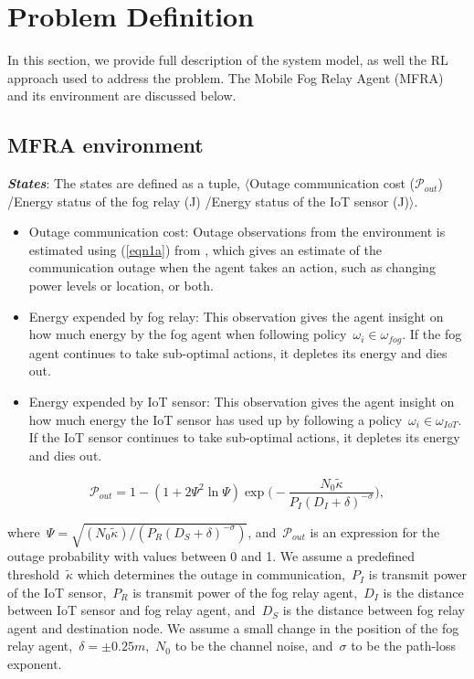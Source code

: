 \documentclass[journal]{IEEEtran}
\begin{document}
\section{Problem Definition}
In this section, we provide full description of the system model, as well the RL approach used to address the problem. The Mobile Fog Relay Agent (MFRA) and its environment are discussed below.

\subsection{MFRA environment}
\emph{\textbf{States}}: The states are defined as a tuple, $\langle$Outage communication cost ($\mathcal{P}_{out}$) /Energy status of the fog relay (J) /Energy status of the IoT sensor (J)$\rangle$.

\begin{itemize}
  \item Outage communication cost: Outage observations from the environment is estimated using (\ref{eqn1a}) from \cite{OmoniwaRelay2018}, which gives an estimate of the communication outage when the agent takes an action, such as changing power levels or location, or both.
  \item Energy expended by fog relay: This observation gives the agent insight on how much energy by the fog agent when following policy~$\omega_i \in \omega_{fog}$. If the fog agent continues to take sub-optimal actions, it depletes its energy and dies out.
  \item Energy expended by IoT sensor: This observation gives the agent insight on how much energy the IoT sensor has used up by following a policy~$\omega_i \in \omega_{IoT}$. If the IoT sensor continues to take sub-optimal actions, it depletes its energy and dies out.
\end{itemize}


\begin{equation}\label{eqn1a}
  \mathcal{P}_{out} = 1 - (1 + 2\Psi^2 \ln \Psi) \exp\Big( -\frac{N_0 \tilde{\kappa}}{P_{I} (D_{I} + \delta)^{-\sigma}}\Big),
\end{equation}


where~$\Psi = \sqrt{(N_0 \tilde{\kappa})/(P_{R}(D_{S} + \delta)^{-\sigma})}$, and~$\mathcal{P}_{out}$ is an expression for the outage probability with values between 0 and 1. We assume a predefined threshold~$\tilde{\kappa}$ which determines the outage in communication,~$P_{I}$ is transmit power of the IoT sensor,~$P_{R}$ is transmit power of the fog relay agent,~$D_{I}$ is the distance between IoT sensor and fog relay agent, and~$D_{S}$ is the distance between fog relay agent and destination node. We assume a small change in the position of the fog relay agent,~$\delta = \pm0.25 m$,~$N_0$ to be the channel noise, and~$\sigma$ to be the path-loss exponent.
\end{document}
